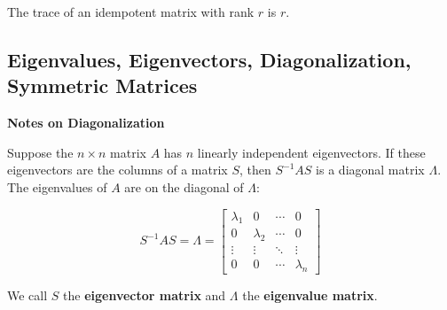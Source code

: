 The trace of an idempotent matrix with rank \(r\) is \(r\).

\subsection{Eigenvalues, Eigenvectors, Diagonalization, Symmetric Matrices}

\textbf{Notes on Diagonalization}

Suppose the \(n \times n\) matrix \(A\) has \(n\) linearly independent eigenvectors. If these eigenvectors are the columns of a matrix \(S\), then \(S^{-1}AS\) is a diagonal matrix \(\Lambda\). The eigenvalues of \(A\) are on the diagonal of \(\Lambda\):

\[
S^{-1}AS = \Lambda = \begin{bmatrix}
   \lambda_1       & 0  & \cdots  & 0  \\
  0  & \lambda_2 & \cdots  & 0 \\
  \vdots  & \vdots  & \ddots & \vdots \\
   0  & 0 & \cdots & \lambda_n
\end{bmatrix}
\]

We call \(S\) the \textbf{eigenvector matrix} and \(\Lambda\) the \textbf{eigenvalue matrix}.


